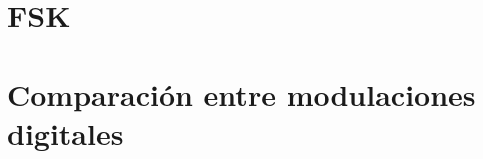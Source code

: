 \documentclass[a4paper]{book}
\begin{document}
\section{FSK}
\section{Comparación entre modulaciones digitales}


%
\end{document}
